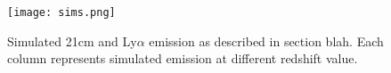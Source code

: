 \begin{figure}[h]
	\centering
	\texttt{[image: sims.png]}
	\caption[Simulated 21cm and Ly$\alpha$ emission]{Simulated 21cm and Ly$\alpha$ emission
	 as described in section blah. Each column represents simulated emission at different
	 redshift value.}
	\label{fig:hera_layout}
\end{figure}
